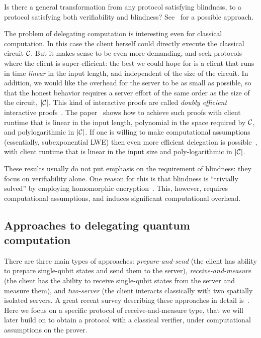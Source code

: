 \begin{oq}
Is there a general transformation from any protocol satisfying blindness, to a protocol satisfying both verifiability and blindness? See~\cite{kashefi2017quantum} for a possible approach. 
\end{oq}

\begin{remark}
The problem of delegating computation is interesting even for classical computation. In this case the client herself could directly execute the classical circuit $\mathcal{C}$. But it makes sense to be even more demanding, and seek protocols where the client is super-efficient: the best we could hope for is a client that runs in time \emph{linear} in the input length, and independent of the size of the circuit. In addition, we would like the overhead for the server to be as small as possible, so that the honest behavior requires a server effort of the same order as the size of the circuit, $|\mathcal{C}|$. This kind of interactive proofs are called \emph{doubly efficient} interactive proofs~\cite{goldwasser2008delegating}. The paper~\cite{reingold2016constant} shows how to achieve such proofs with client runtime that is linear in the input length, polynomial in the space required by $\mathcal{C}$, and polylogarithmic in $|\mathcal{C}|$. If one is willing to make computational assumptions (essentially, subexponential LWE) then even more efficient delegation is possible~\cite{kalai2014delegate}, with client runtime that is linear in the input size and poly-logarithmic in $|\mathcal{C}|$. 

These results usually do not put emphasis on the requirement of blindness: they focus on verifiability alone. One reason for this is that blindness is ``trivially solved'' by employing homomorphic encryption~\cite{gentry2009fully}. This, however, requires computational assumptions, and induces significant computational overhead. 
\end{remark}

\subsection{Approaches to delegating quantum computation}

There are three main types of approaches: \emph{prepare-and-send} (the client has ability to prepare single-qubit states and send them to the server), \emph{receive-and-measure} (the client has the ability to receive single-qubit states from the server and measure them), and \emph{two-server} (the client interacts classically with two spatially isolated servers. 
A great recent survey describing these approaches in detail is~\cite{gheorghiu2019verification}. Here we focus on a specific protocol of receive-and-measure type, that we will later build on to obtain a protocol with a classical verifier, under computational assumptions on the prover. 


